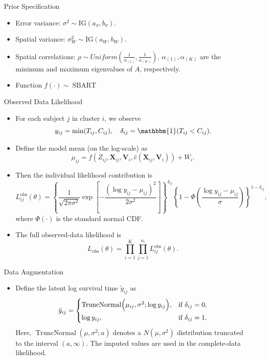\begin{frame}{Prior Specification}
  \begin{itemize}
    \item Error variance: \( \sigma^2 \sim \mathrm{IG}(a_\sigma,b_\sigma) \).
    \item Spatial variance: \( \sigma_W^2 \sim \mathrm{IG}(a_W,b_W) \).
    \item Spatial correlations: \(\rho \sim Uniform(\frac{1}{\alpha_{(1)}},\frac{1}{\alpha_{(K)}})\). \(\alpha_{(1)},\alpha_{(K)}\) are the minimum and maximum eigenvalues of \(A\), respectively.
    \item Function \( f(\cdot) \sim \operatorname{SBART}\)
  \end{itemize}
\end{frame}

\begin{frame}{Observed Data Likelihood}
  \begin{itemize}
    \item For each subject \(j\) in cluster \(i\), we observe
      \[
      y_{ij} = \min(T_{ij}, C_{ij}), \quad \delta_{ij} = \mathbbm{1}(T_{ij} < C_{ij}).
      \]
    \item Define the model mean (on the log-scale) as
      \[
      \mu_{ij} = f(Z_{ij}, \mathbf{X}_{ij}, \mathbf{V}_i, \hat{e}(\mathbf{X}_{ij},\mathbf{V}_i)) + W_i.
      \]
    \item Then the individual likelihood contribution is
      \[
      L_{ij}^{\text{obs}}(\theta) = \left\{ \frac{1}{\sqrt{2\pi\sigma^2}}
      \exp\!\left[-\frac{(\log y_{ij} - \mu_{ij})^2}{2\sigma^2}\right] \right\}^{\delta_{ij}}
      \left\{ 1 - \Phi\!\left(\frac{\log y_{ij} - \mu_{ij}}{\sigma}\right) \right\}^{1-\delta_{ij}},
      \]
      where \(\Phi(\cdot)\) is the standard normal CDF.
    \item The full observed-data likelihood is
      \[
      L_{\text{obs}}(\theta) = \prod_{i=1}^K \prod_{j=1}^{n_i} L_{ij}^{\text{obs}}(\theta).
      \]
  \end{itemize}
\end{frame}

\begin{frame}{ Data Augmentation}
  \begin{itemize}
    \item  Define the latent log survival time \( \tilde{y}_{ij}\) as
      \[
      \tilde{y}_{ij} =
      \begin{cases}
        \operatorname{TruncNormal}\Bigl(\mu_{ij},\sigma^2;\log y_{ij}\Bigr), & \text{if } \delta_{ij}=0, \\[1ex]
        \log y_{ij}, & \text{if } \delta_{ij}=1.
      \end{cases}
      \]
      Here, \(\operatorname{TruncNormal}(\mu,\sigma^2;a)\) denotes a \(N(\mu,\sigma^2)\) distribution truncated to the interval \((a,\infty)\). The imputed values are used in the complete-data likelihood.
  \end{itemize}
\end{frame}

